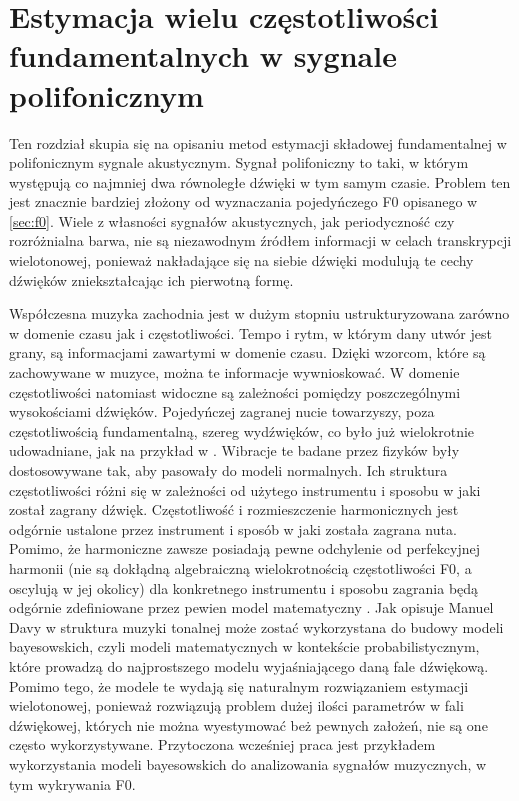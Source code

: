 \documentclass[12pt,a4paper,twoside]{mwart}
\begin{document}
\newpage
\section{Estymacja wielu częstotliwości fundamentalnych w sygnale polifonicznym}\label{sec:MultiPitch}
Ten rozdział skupia się na opisaniu metod estymacji składowej fundamentalnej w polifonicznym sygnale akustycznym. Sygnał polifoniczny to taki, w którym występują co najmniej dwa równoległe dźwięki w tym samym czasie. Problem ten jest znacznie bardziej złożony od wyznaczania pojedyńczego F0 opisanego w \ref{sec:f0}. Wiele z własności sygnałów akustycznych, jak periodyczność czy rozróżnialna barwa, nie są niezawodnym źródłem informacji w celach transkrypcji wielotonowej, ponieważ nakładające się na siebie dźwięki modulują te cechy dźwięków zniekształcając ich pierwotną formę.

Współczesna muzyka zachodnia jest w dużym stopniu ustrukturyzowana zarówno w domenie czasu jak i częstotliwości. Tempo i rytm, w którym dany utwór jest grany, są informacjami zawartymi w domenie czasu. Dzięki wzorcom, które są zachowywane w muzyce, można te informacje wywnioskować. W domenie częstotliwości natomiast widoczne są zależności pomiędzy poszczególnymi wysokościami dźwięków. Pojedyńczej zagranej nucie towarzyszy, poza częstotliwością fundamentalną, szereg wydźwięków, co było już wielokrotnie udowadniane, jak na przykład w 
\cite[1325-1326]{Transcription:Mcintyre:OnTheOscilation}
. Wibracje te badane przez fizyków były dostosowywane tak, aby pasowały do modeli normalnych. Ich struktura częstotliwości różni się w zależności od użytego instrumentu i sposobu w jaki został zagrany dźwięk. Częstotliwość i rozmieszczenie harmonicznych jest odgórnie ustalone przez instrument i sposób w jaki została zagrana nuta. Pomimo, że harmoniczne zawsze posiadają pewne odchylenie od perfekcyjnej harmonii (nie są dokłądną algebraiczną wielokrotnością częstotliwości F0, a oscylują w jej okolicy) dla konkretnego instrumentu i sposobu zagrania będą odgórnie zdefiniowane przez pewien model matematyczny 
\cite[1326-1327]{Transcription:Mcintyre:OnTheOscilation}
. Jak opisuje Manuel Davy w 
\cite[203-204]{Transcription:Anssi:SignalProcessingMethods} 
struktura muzyki tonalnej może zostać wykorzystana do budowy modeli bayesowskich, czyli modeli matematycznych w kontekście probabilistycznym, które prowadzą do najprostszego modelu wyjaśniającego daną fale dźwiękową. Pomimo tego, że modele te wydają się naturalnym rozwiązaniem estymacji wielotonowej, ponieważ rozwiązują problem dużej ilości parametrów w fali dźwiękowej, których nie można wyestymować beż pewnych założeń, nie są one często wykorzystywane. Przytoczona wcześniej praca \cite{Transcription:BayesianHarmonicModels} jest przykładem wykorzystania modeli bayesowskich do analizowania sygnałów muzycznych, w tym wykrywania F0.
\end{document}
